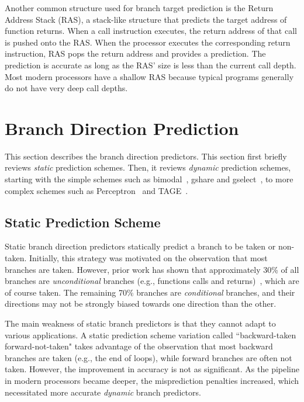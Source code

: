 Another common structure used for branch target prediction is the Return Address Stack (RAS),  a stack-like structure that predicts the target address of function returns. When a call instruction executes, the return address of that call is pushed onto the RAS. When the processor executes the corresponding return instruction, RAS pops the return address and provides a prediction. The prediction is accurate as long as the RAS' size is less than the current call depth. Most modern processors have a shallow RAS because typical programs generally do not have very deep call depths.


\section{Branch Direction Prediction}
\label{sec:background:dirpred}
This section describes the branch direction predictors. This section first briefly reviews \textit{static} prediction schemes. Then, it reviews \textit{dynamic} prediction schemes, starting with the simple schemes such as bimodal~\cite{bimodal}, gshare and gselect~\cite{McFarling}, to more complex schemes such as Perceptron~\cite{perceptron} and TAGE~\cite{tage}.

\subsection{Static Prediction Scheme}
\label{sec:background:dirpred:static}
Static branch direction predictors statically predict a branch to be taken or non-taken. Initially, this strategy was motivated on the observation that most branches are taken. However, prior work has shown that approximately 30\% of all branches are \textit{unconditional} branches (e.g., functions calls and returns)~\cite{histogram}, which are of course taken. The remaining 70\% branches are \textit{conditional} branches, and their directions may not be strongly biased towards one direction than the other.

The main weakness of static branch predictors is that they cannot adapt to various applications. A static prediction scheme variation called ``backward-taken forward-not-taken" takes advantage of the observation that most backward branches are taken (e.g., the end of loops), while forward branches are often not taken. However, the improvement in accuracy is not as significant. As the pipeline in modern processors became deeper, the misprediction penalties increased, which necessitated more accurate \textit{dynamic} branch predictors.

